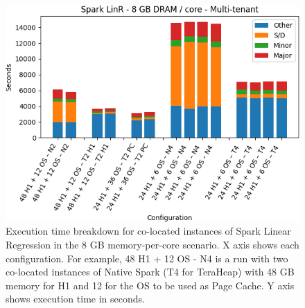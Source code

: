 \begin{figure}[thbp]

    \includegraphics[width=\linewidth]{./fig/linr128.png}
    \caption{Execution time breakdown for co-located instances of Spark
    Linear Regression in the 8 GB memory-per-core scenario. X axis shows each configuration.
        For example, 48 H1 + 12 OS - N4 is a run with two co-located instances of Native Spark (T4 for TeraHeap) with 48 GB memory for H1 and 12 for the OS to be used as Page Cache. Y axis shows execution time in seconds.}
    \label{fig:linr128}
\end{figure}


